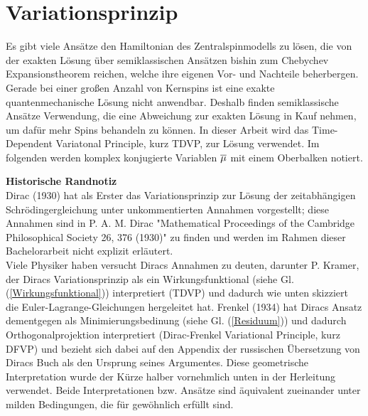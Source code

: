 \chapter{Variationsprinzip}
Es gibt viele Ansätze den Hamiltonian des Zentralspinmodells zu lösen, die von der exakten Lösung über 
semiklassischen Ansätzen\cite{PhysRevB.65.205309,PhysRevB.94.094308,PhysRevB.70.205327,NatalieJaeschke} bishin zum
Chebychev Expansionstheorem reichen\cite{PhysRevB.89.045317}, welche ihre eigenen Vor- und Nachteile beherbergen. 
Gerade bei einer großen Anzahl von Kernspins ist eine exakte quantenmechanische Lösung nicht anwendbar. Deshalb finden semiklassische Ansätze Verwendung, 
die eine Abweichung zur exakten Lösung in Kauf nehmen, um dafür mehr Spins behandeln zu können. In dieser Arbeit wird das Time-Dependent Variatonal 
Principle, kurz TDVP, zur Lösung verwendet. Im folgenden werden komplex konjugierte Variablen $\overline{\mu}$ mit einem Oberbalken notiert.

\textbf{Historische Randnotiz}\\
Dirac (1930) hat als Erster das Variationsprinzip zur Lösung der zeitabhängigen Schrödingergleichung unter unkommentierten Annahmen vorgestellt; 
diese Annahmen sind in P. A. M. Dirac "Mathematical Proceedings of the Cambridge Philosophical Society 26, 376 (1930)"\cite{Dirac1930-fc} 
zu finden und werden im Rahmen dieser Bachelorarbeit nicht explizit erläutert. \\
Viele Physiker haben versucht Diracs Annahmen zu deuten, darunter P. Kramer, der Diracs Variationsprinzip als ein Wirkungsfunktional 
(siehe Gl. (\ref{Wirkungsfunktional})) interpretiert (TDVP) \cite{noauthor_2008-dn} und dadurch wie unten skizziert die Euler-Lagrange-Gleichungen hergeleitet hat.
Frenkel (1934) hat Diracs Ansatz dementgegen als Minimierungsbedinung (siehe Gl. (\ref{Residuum})) und dadurch Orthogonalprojektion interpretiert (Dirac-Frenkel Variational Principle, kurz DFVP) und 
bezieht sich dabei auf den Appendix der russischen Übersetzung von Diracs Buch als den Ursprung seines Argumentes\cite{Mott1934-lg}.
Diese geometrische Interpretation wurde der Kürze halber vornehmlich unten in der Herleitung verwendet. Beide Interpretationen bzw. Ansätze
sind äquivalent zueinander unter milden Bedingungen\cite{BROECKHOVE1988547}, die für gewöhnlich erfüllt sind.

